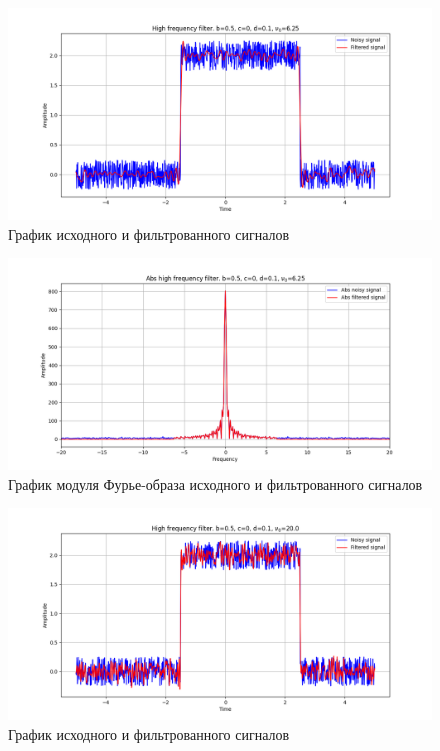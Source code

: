 \documentclass[a4paper, 16pt]{article}
\begin{document}
    \begin{figure}[!htb]
        \centering
        \includegraphics[scale=0.485]{7_u_flt_u_nohigh.png}
        \captionsetup{skip=0pt}
        \caption{График исходного и фильтрованного сигналов}
        \label{fig:fig13}
    \end{figure}
    \newpage
    \begin{figure}[!htb]
        \centering
        \includegraphics[scale=0.485]{7_abs_u_U_nohigh.png}
        \captionsetup{skip=0pt}
        \caption{График модуля Фурье-образа исходного и фильтрованного сигналов}
        \label{fig:fig14}
    \end{figure}
    \begin{figure}[!htb]
        \centering
        \includegraphics[scale=0.485]{6_u_flt_u_nohigh.png}
        \captionsetup{skip=0pt}
        \caption{График исходного и фильтрованного сигналов}
        \label{fig:fig15}
    \end{figure}
\end{document}
